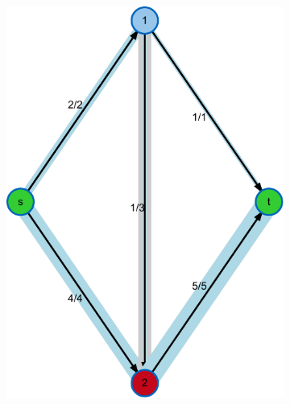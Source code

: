 \begin{figure}
\centering
\begin{subfigure}[t]{0.45\textwidth}
\includegraphics[width=\textwidth]{fig/maxflow-graph-algorithm-graph}
\end{subfigure}
\begin{subfigure}[t]{0.45\textwidth}

\end{subfigure}
\end{figure}
